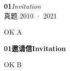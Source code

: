 \documentclass[10pt,a4paper]{ctexart}
\begin{document}
\noindent\colorbox{accent}{%
\parbox{\dimexpr\linewidth-2\fboxsep\relax}{%
\color{white}\vspace{1pt}
{\LARGE\bfseries 01}\hspace{0.5em}{\Large 邀请信}\hfill{\large\itshape Invitation}
\\[1pt]{\footnotesize 真题 2010 · 2021}\par\vspace{1pt}}}

\vspace{4pt}

OK A

\noindent\colorbox{accent}{\parbox{\dimexpr\linewidth-2\fboxsep\relax}{\color{white}\LARGE\bfseries 01\quad 邀请信\hfill Invitation}}

\vspace{4pt}
OK B
\end{document}
